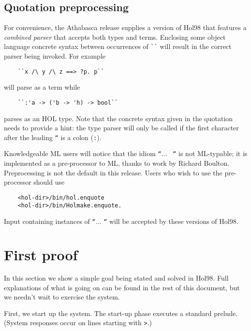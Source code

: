 \documentclass[12pt,fleqn,a4paper]{report}
\begin{document}
\subsection{Quotation preprocessing}

For convenience, the Athabasca release supplies a version of Hol98 that
features a {\it combined parser\/} that accepts both types and
terms. Enclosing some object language concrete syntax between
occurrences of \verb+``+ will result in the correct parser being
invoked. For example

\begin{verbatim}
    ``x /\ y /\ z ==> ?p. p``
\end{verbatim}

\noindent will parse as a term while

\begin{verbatim}
    ``:'a -> ('b -> 'h) -> bool``
\end{verbatim}

\noindent parses as an HOL type. Note that the concrete syntax given in
the quotation needs to provide a hint: the type parser will only be
called if the first character after the leading {\tt ``} is a colon (\verb+:+).

Knowledgeable ML users will notice that the idiom {\tt ``}$\ldots$ {\tt
``} is not ML-typable; it is implemented as a pre-processor to ML,
thanks to work by Richard Boulton. Preprocessing is not the default in
this release. Users who wish to use the pre-processor should use

\begin{verbatim}
    <hol-dir>/bin/hol.enquote
    <hol-dir>/bin/Holmake.enquote.
\end{verbatim}

Input containing instances of {\tt ``}$\ldots$ {\tt ``} will be accepted
by these versions of Hol98.

\section{First proof}

In this section we show a simple goal being stated and solved in
Hol98. Full explanations of what is going on can be found in the rest of
this document, but we needn't wait to exercise the system.

First, we start up the system. The start-up phase executes a standard
prelude. (System responses occur on lines starting with \verb+>+.)
\end{document}
